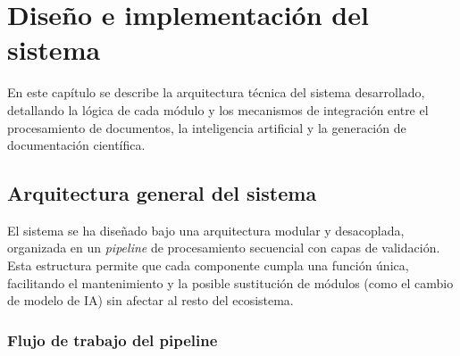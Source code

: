 
\chapter{Diseño e implementación del sistema}

En este capítulo se describe la arquitectura técnica del sistema desarrollado, detallando la lógica de cada módulo y los mecanismos de integración entre el procesamiento de documentos, la inteligencia artificial y la generación de documentación científica.

\section{Arquitectura general del sistema}

El sistema se ha diseñado bajo una arquitectura modular y desacoplada, organizada en un \textit{pipeline} de procesamiento secuencial con capas de validación. Esta estructura permite que cada componente cumpla una función única, facilitando el mantenimiento y la posible sustitución de módulos (como el cambio de modelo de IA) sin afectar al resto del ecosistema.

\subsection{Flujo de trabajo del pipeline}

